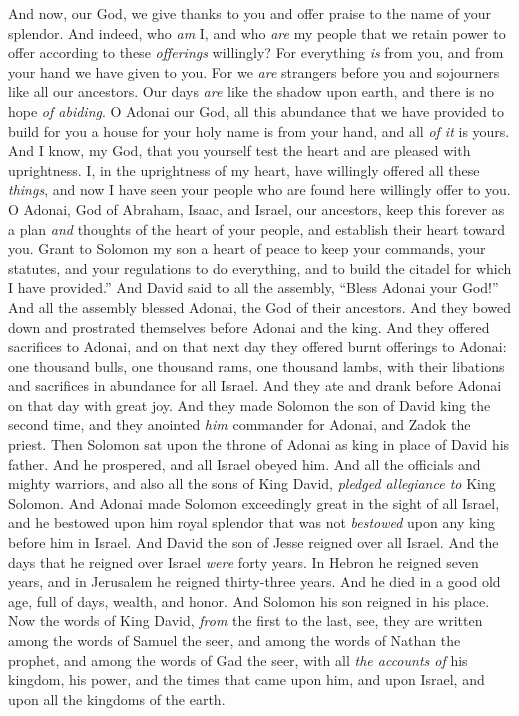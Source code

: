\begin{biblechapter}
\verse And now, our God, we give thanks to you and offer praise to the name of your splendor.
\verse And indeed, who \textit{am} I, and who \textit{are} my people that we retain power to offer according to these \textit{offerings} willingly? For everything \textit{is} from you, and from your hand we have given to you.
\verse For we \textit{are} strangers before you and sojourners like all our ancestors. Our days \textit{are} like the shadow upon earth, and there is no hope \textit{of abiding}.
\verse O Adonai our God, all this abundance that we have provided to build for you a house for your holy name is from your hand, and all \textit{of it} is yours.
\verse And I know, my God, that you yourself test the heart and are pleased with uprightness. I, in the uprightness of my heart, have willingly offered all these \textit{things}, and now I have seen your people who are found here willingly offer to you.
\verse O Adonai, God of Abraham, Isaac, and Israel, our ancestors, keep this forever as a plan \textit{and} thoughts of the heart of your people, and establish their heart toward you.
\verse Grant to Solomon my son a heart of peace to keep your commands, your statutes, and your regulations to do everything, and to build the citadel for which I have provided.”
\verse And David said to all the assembly, “Bless Adonai your God!” And all the assembly blessed Adonai, the God of their ancestors. And they bowed down and prostrated themselves before Adonai and the king.
 And they offered sacrifices to Adonai, and on that next day they offered burnt offerings to Adonai: one thousand bulls, one thousand rams, one thousand lambs, with their libations and sacrifices in abundance for all Israel.
\verse And they ate and drank before Adonai on that day with great joy. And they made Solomon the son of David king the second time, and they anointed \textit{him} commander for Adonai, and Zadok the priest.
\verse Then Solomon sat upon the throne of Adonai as king in place of David his father. And he prospered, and all Israel obeyed him.
\verse And all the officials and mighty warriors, and also all the sons of King David, \textit{pledged allegiance to} King Solomon.
\verse And Adonai made Solomon exceedingly great in the sight of all Israel, and he bestowed upon him royal splendor that was not \textit{bestowed} upon any king before him in Israel.
 And David the son of Jesse reigned over all Israel.
\verse And the days that he reigned over Israel \textit{were} forty years. In Hebron he reigned seven years, and in Jerusalem he reigned thirty-three years.
\verse And he died in a good old age, full of days, wealth, and honor. And Solomon his son reigned in his place.
\verse Now the words of King David, \textit{from} the first to the last, see, they are written among the words of Samuel the seer, and among the words of Nathan the prophet, and among the words of Gad the seer,
\verse with all \textit{the accounts of} his kingdom, his power, and the times that came upon him, and upon Israel, and upon all the kingdoms of the earth.
\end{biblechapter}

